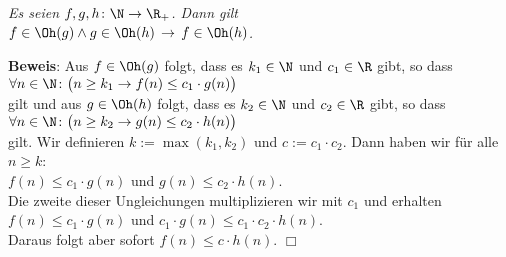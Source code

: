 \begin{Proposition}[Transitivit\"at]
{\em
  Es seien $f,g,h \colon \N \rightarrow {\R_+}$.  Dann gilt \\[0.1cm]
  \hspace*{1.3cm} $f \in \Oh(g) \wedge g \in \Oh(h) \,\rightarrow\, f \in \Oh(h)$.
}
\end{Proposition}
\textbf{Beweis}: Aus $f \in \Oh(g)$ folgt, dass es $k_1 \in \N$ und $c_1 \in \R$ gibt, so dass\\[0.1cm]
\hspace*{1.3cm} 
$\forall n \in \N \colon\bigl( n \geq k_1 \rightarrow f(n) \leq c_1 \cdot g(n)\bigr)$ \\[0.1cm]
gilt und aus $g \in \Oh(h)$ folgt, dass es $k_2 \in \N$ und $c_2 \in \R$ gibt, so dass \\[0.1cm]
\hspace*{1.3cm} 
$\forall n \in \N \colon\bigl( n \geq k_2 \rightarrow g(n) \leq c_2 \cdot h(n)\bigr)$ \\[0.1cm]
gilt.  Wir definieren $k:= \max(k_1,k_2)$ und $c := c_1 \cdot c_2$.  Dann haben wir f\"ur alle
$n \geq k$:\\[0.1cm]
\hspace*{1.3cm} $f(n) \leq c_1\cdot g(n)$ und $g(n) \leq c_2 \cdot h(n)$. \\[0.1cm]
Die zweite dieser Ungleichungen multiplizieren wir mit $c_1$ und erhalten \\[0.1cm]
\hspace*{1.3cm} $f(n) \leq c_1\cdot g(n)$ und $c_1\cdot g(n) \leq c_1\cdot c_2 \cdot h(n)$. \\[0.1cm]
Daraus folgt aber sofort $f(n) \leq c \cdot h(n)$. \hspace*{\fill} $\Box$

